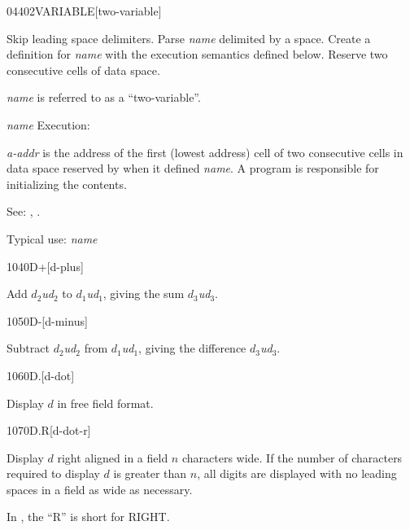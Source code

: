 \begin{newword}{0440}{2VARIABLE}[two-variable]

	Skip leading space delimiters. Parse \emph{name} delimited by a
	space. Create a definition for \emph{name} with the execution
	semantics defined below. Reserve two consecutive cells of data
	space.

	\emph{name} is referred to as a ``two-variable''.

\item[\emph{name} Execution:]

	\emph{a-addr} is the address of the first (lowest address)
	cell of two consecutive cells in data space reserved by
	 when it defined \emph{name}. A program is
	responsible for initializing the contents.

\item[See:]
	,
	.

	\begin{rationale} %
		Typical use:
			 \emph{name}
	\end{rationale}
\end{newword}


\begin{newword}{1040}{D+}[d-plus]

	Add $d_2$\textbar\emph{ud}$_2$ to $d_1$\textbar\emph{ud}$_1$,
	giving the sum $d_3$\textbar\emph{ud}$_3$.
\end{newword}


\begin{newword}{1050}{D-}[d-minus]

	Subtract $d_2$\textbar\emph{ud}$_2$ from $d_1$\textbar\emph{ud}$_1$,
	giving the difference $d_3$\textbar\emph{ud}$_3$.
\end{newword}


\begin{newword}{1060}{D.}[d-dot]

	Display $d$ in free field format.
\end{newword}


\begin{newword}{1070}{D.R}[d-dot-r]

	Display $d$ right aligned in a field $n$ characters wide.
	If the number of characters required to display $d$ is greater
	than $n$, all digits are displayed with no leading spaces in
	a field as wide as necessary.

	\begin{rationale} %
		In , the ``R'' is short for RIGHT.
	\end{rationale}
\end{newword}


